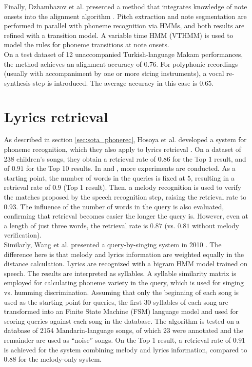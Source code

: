 Finally, Dzhambazov et al. presented a method that integrates knowledge of note onsets into the alignment algorithm \cite{dzhambazov_alignment}. Pitch extraction and note segmentation are performed in parallel with phoneme recognition via HMMs, and both results are refined with a transition model. A variable time HMM (VTHMM) is used to model the rules for phoneme transitions at note onsets.\\
On a test dataset of 12 unaccompanied Turkish-language Makam performances, the method achieves an alignment accuracy of $0.76$. For polyphonic recordings (usually with accompaniment by one or more string instruments), a vocal re-synthesis step is introduced. The average accuracy in this case is $0.65$.\\




\section{Lyrics retrieval}
As described in section \ref{sec:sota_phonerec}, Hosoya et al. developed a system for phoneme recognition, which they also apply to lyrics retrieval \cite{Hosoya2005}. On a dataset of 238 children's songs, they obtain a retrieval rate of $0.86$ for the Top 1 result, and of $0.91$ for the Top 10 results. In \cite{suzuki06} and \cite{suzuki07}, more experiments are conducted. As a starting point, the number of words in the queries is fixed at 5, resulting in a retrieval rate of $0.9$ (Top 1 result). Then, a melody recognition is used to verify the matches proposed by the speech recognition step, raising the retrieval rate to $0.93$. The influence of the number of words in the query is also evaluated, confirming that retrieval becomes easier the longer the query is. However, even at a length of just three words, the retrieval rate is $0.87$ (vs. $0.81$ without melody verification).\\

Similarly, Wang et al. presented a query-by-singing system in 2010 \cite{Wang2010}. The difference here is that melody and lyrics information are weighted equally in the distance calculation. Lyrics are recognized with a bigram HMM model trained on speech. The results are interpreted as syllables. A syllable similarity matrix is employed for calculating phoneme variety in the query, which is used for singing vs. humming discrimination. Assuming that only the beginning of each song is used as the starting point for queries, the first 30 syllables of each song are transformed into an Finite State Machine (FSM) language model and used for scoring queries against each song in the database. The algorithm is tested on a database of 2154 Mandarin-language songs, of which 23 were annotated and the remainder are used as ``noise'' songs. On the Top 1 result, a retrieval rate of $0.91$ is achieved for the system combining melody and lyrics information, compared to $0.88$ for the melody-only system.\\

